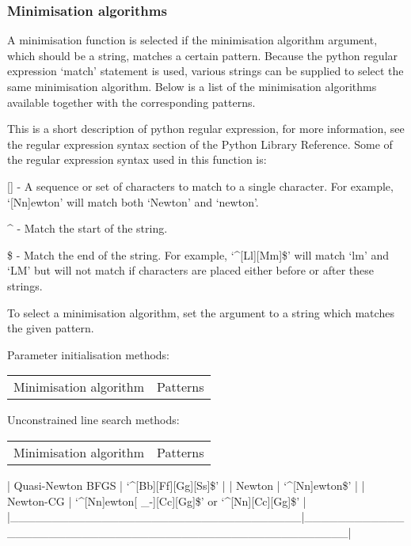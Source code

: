 \subsubsection{Minimisation algorithms}

A minimisation function is selected if the minimisation algorithm argument, which should be a
string, matches a certain pattern.  Because the python regular expression `match' statement is
used, various strings can be supplied to select the same minimisation algorithm.  Below is a
list of the minimisation algorithms available together with the corresponding patterns.

This is a short description of python regular expression, for more information, see the
regular expression syntax section of the Python Library Reference.  Some of the regular
expression syntax used in this function is:

    [] - A sequence or set of characters to match to a single character.  For example,
    `[Nn]ewton' will match both `Newton' and `newton'.

    \^{} - Match the start of the string.

    \$ - Match the end of the string.  For example, `\^{}[Ll][Mm]\$' will match `lm' and `LM' but
    will not match if characters are placed either before or after these strings.

To select a minimisation algorithm, set the argument to a string which matches the given
pattern.


Parameter initialisation methods:


\begin{tabular}{cc}
Minimisation algorithm & Patterns \\
\end{tabular}


Unconstrained line search methods:


\begin{tabular}{cc}
Minimisation algorithm & Patterns \\
\end{tabular}
| Quasi-Newton BFGS                 | `\^{}[Bb][Ff][Gg][Ss]\$'                                |
| Newton                            | `\^{}[Nn]ewton\$'                                       |
| Newton-CG                         | `\^{}[Nn]ewton[ \_-][Cc][Gg]\$' or `\^{}[Nn][Cc][Gg]\$'      |
|\_\_\_\_\_\_\_\_\_\_\_\_\_\_\_\_\_\_\_\_\_\_\_\_\_\_\_\_\_\_\_\_\_\_\_|\_\_\_\_\_\_\_\_\_\_\_\_\_\_\_\_\_\_\_\_\_\_\_\_\_\_\_\_\_\_\_\_\_\_\_\_\_\_\_\_\_\_\_\_\_\_\_\_\_\_\_\_\_|


